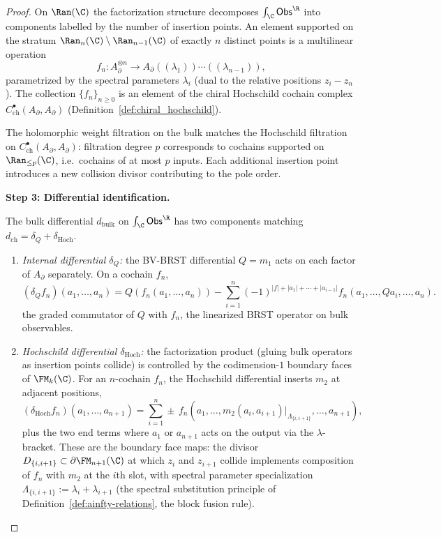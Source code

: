 \begin{proof}
On $\Ran(\C)$ the factorization structure decomposes $\int_{\C} \mathsf{Obs}^{\R}$ into components labelled by the number of insertion points. An element supported on the stratum $\Ran_n(\C) \setminus \Ran_{n-1}(\C)$ of exactly $n$ distinct points is a multilinear operation
\begin{equation}
\label{eq:Ran-component}
f_n : A_{\partial}^{\otimes n} \longrightarrow A_{\partial}((\lambda_1)) \cdots ((\lambda_{n-1})),
\end{equation}
parametrized by the spectral parameters $\lambda_i$ (dual to the relative positions $z_i - z_n$). The collection $\{f_n\}_{n \geq 0}$ is an element of the chiral Hochschild cochain complex $C^\bullet_{\mathrm{ch}}(A_{\partial}, A_{\partial})$ (Definition~\ref{def:chiral_hochschild}).

The holomorphic weight filtration on the bulk matches the Hochschild filtration on $C^\bullet_{\mathrm{ch}}(A_{\partial}, A_{\partial})$: filtration degree $p$ corresponds to cochains supported on $\Ran_{\leq p}(\C)$, i.e.\ cochains of at most $p$ inputs. Each additional insertion point introduces a new collision divisor contributing to the pole order.

\medskip
\textbf{Step 3: Differential identification.}

The bulk differential $d_{\mathrm{bulk}}$ on $\int_{\C} \mathsf{Obs}^{\R}$ has two components matching $d_{\mathrm{ch}} = \delta_Q + \delta_{\mathrm{Hoch}}$.

\begin{enumerate}[label=(\roman*)]
\item \emph{Internal differential $\delta_Q$:} the BV-BRST differential $Q = m_1$ acts on each factor of $A_{\partial}$ separately. On a cochain $f_n$,
\[
(\delta_Q f_n)(a_1, \ldots, a_n) = Q(f_n(a_1, \ldots, a_n)) - \sum_{i=1}^n (-1)^{|f| + |a_1| + \cdots + |a_{i-1}|} f_n(a_1, \ldots, Qa_i, \ldots, a_n).
\]
the graded commutator of $Q$ with $f_n$, the linearized BRST operator on bulk observables.

\item \emph{Hochschild differential $\delta_{\mathrm{Hoch}}$:} the factorization product (gluing bulk operators as insertion points collide) is controlled by the codimension-$1$ boundary faces of $\FM_k(\C)$. For an $n$-cochain $f_n$, the Hochschild differential inserts $m_2$ at adjacent positions,
\[
(\delta_{\mathrm{Hoch}} f_n)(a_1, \ldots, a_{n+1}) = \sum_{i=1}^{n} \pm\, f_n(a_1, \ldots, m_2(a_i, a_{i+1})\big|_{\Lambda_{\{i,i+1\}}}, \ldots, a_{n+1}),
\]
plus the two end terms where $a_1$ or $a_{n+1}$ acts on the output via the $\lambda$-bracket. These are the boundary face maps: the divisor $D_{\{i,i+1\}} \subset \partial \FM_{n+1}(\C)$ at which $z_i$ and $z_{i+1}$ collide implements composition of $f_n$ with $m_2$ at the $i$th slot, with spectral parameter specialization $\Lambda_{\{i,i+1\}} := \lambda_i + \lambda_{i+1}$ (the spectral substitution principle of Definition~\ref{def:ainfty-relations}, the block fusion rule).
\end{enumerate}


\end{proof}
